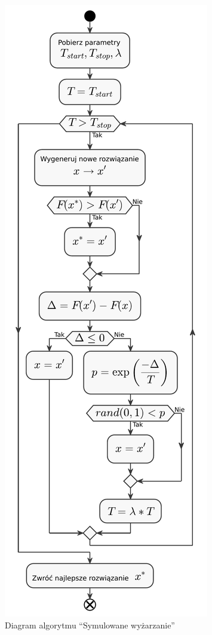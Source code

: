 \begin{figure}[H]
    \centering
    \includegraphics[scale=0.67]{chapters/chapter4/sa.pdf}
    \caption{Diagram algorytmu ``Symulowane wyżarzanie''}
    \label{sa}
\end{figure}
